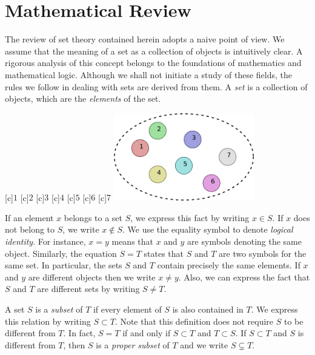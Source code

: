 \chapter{Mathematical Review}

The review of set theory contained herein adopts a naive point of view.
We assume that the meaning of a set as a collection of objects is intuitively clear.
A rigorous analysis of this concept belongs to the foundations of mathematics and mathematical logic.
Although we shall not initiate a study of these fields, the rules we follow in dealing with sets are derived from them.
A \emph{set} is a collection of objects, which are the \emph{elements} of the set.  

\begin{center}
\begin{psfrags}
[c]{$1$}
[c]{$2$}
[c]{$3$}
[c]{$4$}
[c]{$5$}
[c]{$6$}
[c]{$7$}
\includegraphics[height=3.825cm]{Figures/1Chapter/basicset}
\end{psfrags}
\end{center}

If an element $x$ belongs to a set $S$, we express this fact by writing $x \in S$.
If $x$ does not belong to $S$, we write $x \notin S$.
We use the equality symbol to denote \emph{logical identity}.
For instance, $x = y$ means that $x$ and $y$ are symbols denoting the same object.
Similarly, the equation $S = T$ states that $S$ and $T$ are two symbols for the same set.
In particular, the sets $S$ and $T$ contain precisely the same elements.
If $x$ and $y$ are different objects then we write $x \neq y$.
Also, we can express the fact that $S$ and $T$ are different sets by writing $S \neq T$.

A set $S$ is a \emph{subset} of $T$ if every element of $S$ is also contained in $T$. 
We express this relation by writing $S \subset T$.
Note that this definition does not require $S$ to be different from $T$.
In fact, $S = T$ if and only if $S \subset T$ and $T \subset S$.
If $S \subset T$ and $S$ is different from $T$, then $S$ is a \emph{proper subset} of $T$ and we write $S \subsetneq T$. 

